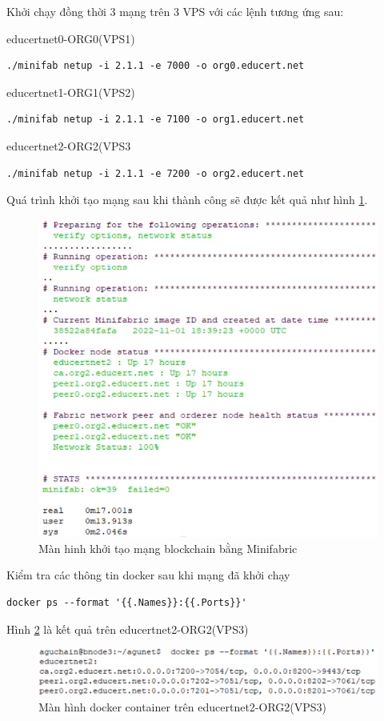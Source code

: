 \begin{enumerate}
    Khởi chạy đồng thời 3 mạng trên 3 VPS với các lệnh tương ứng sau:

    educertnet0-ORG0(VPS1)
    \begin{Verbatim}[fontsize=\small]
    ./minifab netup -i 2.1.1 -e 7000 -o org0.educert.net
    \end{Verbatim}

   educertnet1-ORG1(VPS2)
    \begin{Verbatim}[fontsize=\small]
    ./minifab netup -i 2.1.1 -e 7100 -o org1.educert.net
    \end{Verbatim}

    educertnet2-ORG2(VPS3
    \begin{Verbatim}[fontsize=\small]
    ./minifab netup -i 2.1.1 -e 7200 -o org2.educert.net
    \end{Verbatim}

Quá trình khởi tạo mạng sau khi thành công sẽ được kết quả như hình \ref{fig:hf_done_diagram}.

    \begin{figure}[H]
    \centering
    \includegraphics[width=.8\linewidth]{img/hf_done.png}
    \caption{Màn hinh khởi tạo mạng blockchain bằng Minifabric}
    \label{fig:hf_done_diagram}
    \end{figure}

Kiểm tra các thông tin docker sau khi mạng đã khởi chạy
    \begin{Verbatim}[fontsize=\small]
    docker ps --format '{{.Names}}:{{.Ports}}'
    \end{Verbatim}

Hình \ref{fig:educertnet2_diagram} là kết quả trên educertnet2-ORG2(VPS3)
    \begin{figure}[H]
    \centering
    \includegraphics[width=.8\linewidth]{img/educertnet2.png}
    \caption{Màn hình docker container trên educertnet2-ORG2(VPS3)}
    \label{fig:educertnet2_diagram}
    \end{figure}
    

\end{enumerate}
